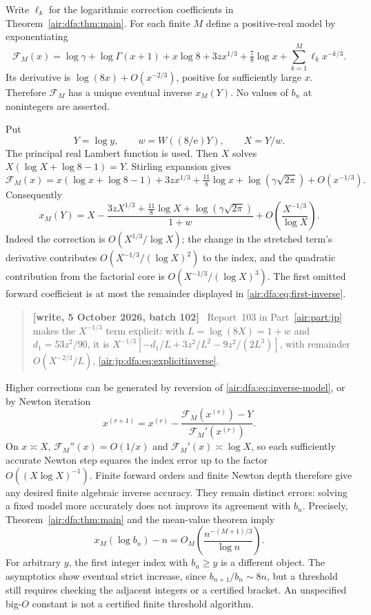 \documentclass[11pt,letterpaper]{article}
\numberwithin{equation}{section}
\theoremstyle{remark}
\newcommand{\ee}{\mathrm e}
\newenvironment{writenotejp}{\par\smallskip\begin{quote}\small\textbf{[write, 5 October 2026, batch 102]}\ }{\end{quote}\smallskip}
\begin{document}
Write $\ell_k$ for the logarithmic correction coefficients in
Theorem~\ref{air:dfa:thm:main}. For each finite $M$ define a positive-real model
by exponentiating
\begin{equation}\label{air:dfa:eq:inverse-model}
\mathcal F_M(x)=\log\gamma+\log\Gamma(x+1)+x\log8+3zx^{1/3}
+\tfrac78\log x+\sum_{k=1}^{M}\ell_k x^{-k/3}.
\end{equation}
Its derivative is $\log(8x)+O(x^{-2/3})$, positive for sufficiently large
$x$. Therefore $\mathcal F_M$ has a unique eventual inverse $x_M(Y)$.
No values of $b_n$ at nonintegers are asserted.

Put
\[
Y=\log y,\qquad w=W((8/\ee)Y),\qquad X=Y/w.
\]
The principal real Lambert function is used. Then $X$ solves
$X(\log X+\log8-1)=Y$. Stirling expansion gives
\[
\mathcal F_M(x)=x(\log x+\log8-1)+3zx^{1/3}
+\tfrac{11}{8}\log x+\log(\gamma\sqrt{2\pi})+O(x^{-1/3}).
\]
Consequently
\begin{equation}\label{air:dfa:eq:first-inverse}
x_M(Y)=X-
\frac{3zX^{1/3}+\frac{11}{8}\log X+\log(\gamma\sqrt{2\pi})}{1+w}
+O\!\left(\frac{X^{-1/3}}{\log X}\right).
\end{equation}
Indeed the correction is $O(X^{1/3}/\log X)$; the change in the stretched
term's derivative contributes $O(X^{-1/3}/(\log X)^2)$ to the index, and
the quadratic contribution from the factorial core is
$O(X^{-1/3}/(\log X)^3)$. The first omitted forward coefficient is at
most the remainder displayed in \eqref{air:dfa:eq:first-inverse}.
\begin{writenotejp}
Report~103 in Part~\ref{air:part:jp} makes the $X^{-1/3}$ term explicit: with $L=\log(8X)=1+w$ and $d_1=53z^2/90$, it is $X^{-1/3}[-d_1/L+3z^2/L^2-9z^2/(2L^3)]$, with remainder $O(X^{-2/3}/L)$, \eqref{air:jp:dfa:eq:explicitinverse}.
\end{writenotejp}

Higher corrections can be generated by reversion of
\eqref{air:dfa:eq:inverse-model}, or by Newton iteration
\[
x^{(r+1)}=x^{(r)}-
\frac{\mathcal F_M(x^{(r)})-Y}{\mathcal F_M'(x^{(r)})}.
\]
On $x\asymp X$, $\mathcal F_M''(x)=O(1/x)$ and
$\mathcal F_M'(x)\asymp\log X$, so each sufficiently accurate Newton
step squares the index error up to the factor $O((X\log X)^{-1})$.
Finite forward orders and finite Newton depth therefore give any desired
finite algebraic inverse accuracy. They remain distinct errors: solving
a fixed model more accurately does not improve its agreement with $b_n$.
Precisely, Theorem~\ref{air:dfa:thm:main} and the mean-value theorem imply
\begin{equation}\label{air:dfa:eq:index-error}
x_M(\log b_n)-n=
O_M\!\left(\frac{n^{-(M+1)/3}}{\log n}\right).
\end{equation}
For arbitrary $y$, the first integer index with $b_n\ge y$ is a different
object. The asymptotics show eventual strict increase, since
$b_{n+1}/b_n\sim8n$, but a threshold still requires checking the adjacent
integers or a certified bracket. An unspecified big-$O$ constant is not a
certified finite threshold algorithm.
\end{document}
